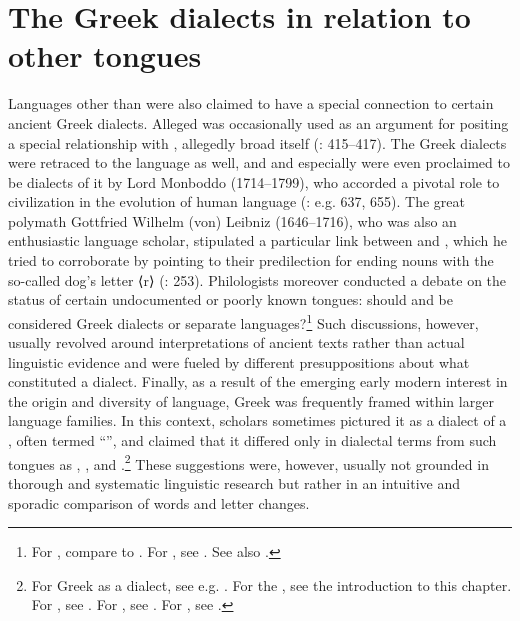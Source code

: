 \section{The Greek dialects in relation to other tongues}\label{sec:5.7}

Languages other than  were also claimed to have a special connection to certain ancient Greek dialects. Alleged   was occasionally used as an argument for positing a special relationship with , allegedly broad itself (\citealt{Saumaise1643a}: 415–417). The Greek dialects were retraced to the  language as well, and  and especially  were even proclaimed to be dialects of it by Lord Monboddo (1714–1799), who accorded a pivotal role to  civilization in the evolution of human language (\citealt{Monboddo1774}: e.g. 637, 655). The great polymath Gottfried Wilhelm (von) Leibniz (1646–1716), who was also an enthusiastic language scholar, stipulated a particular link between  and , which he tried to corroborate by pointing to their predilection for ending nouns with the so-called dog’s letter ⟨r⟩ (\citealt{Leibniz1991}: 253). Philologists moreover conducted a debate on the status of certain undocumented or poorly known tongues: should  and  be considered Greek dialects or separate languages?\footnote{For , compare \citet[465]{Rijcke1684} to \citet[16]{Jablonski1714}. For , see \citet[2]{Jablonski1714}. See also \citet[]{VanRooyFcd}.} Such discussions, however, usually revolved around interpretations of ancient texts rather than actual linguistic evidence and were fueled by different presuppositions about what constituted a dialect. Finally, as a result of the emerging early modern interest in the origin and diversity of language, Greek was frequently framed within larger language families. In this context, scholars sometimes pictured it as a dialect of a , often termed “”, and claimed that it differed only in dialectal terms from such tongues as , , and .\footnote{For Greek as a  dialect, see e.g. \citet[xxxiv]{Court1778}. For the , see the introduction to this chapter. For , see \citet[139; 190]{Casaubon1650}. For , see \citet[*.3\textsc{\textsuperscript{v}}]{Junius1665}. For , see \citet[\textsc{i}.44]{Martin1727}.} These suggestions were, however, usually not grounded in thorough and systematic linguistic research but rather in an intuitive and sporadic comparison of words and letter changes.

